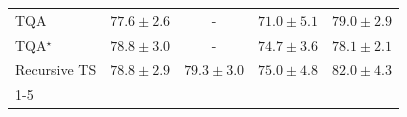 \begin{tabular}{l|cccc|}
TQA & {\cellcolor[HTML]{4295C3}} \color[HTML]{F1F1F1} $77.6\pm 2.6$ & {\cellcolor[HTML]{000000}} \color[HTML]{F1F1F1} {\cellcolor{white}} \color{black} - & {\cellcolor[HTML]{FFF7FB}} \color[HTML]{000000} $71.0\pm 5.1$ & {\cellcolor[HTML]{0D75B3}} \color[HTML]{F1F1F1} $79.0\pm 2.9$ \\
TQA$^\star$ & {\cellcolor[HTML]{157AB5}} \color[HTML]{F1F1F1} $78.8\pm 3.0$ & {\cellcolor[HTML]{000000}} \color[HTML]{F1F1F1} {\cellcolor{white}} \color{black} - & {\cellcolor[HTML]{B3C3DE}} \color[HTML]{000000} $74.7\pm 3.6$ & {\cellcolor[HTML]{2D8ABD}} \color[HTML]{F1F1F1} $78.1\pm 2.1$ \\
Recursive TS & {\cellcolor[HTML]{157AB5}} \color[HTML]{F1F1F1} $78.8\pm 2.9$ & {\cellcolor[HTML]{056FAE}} \color[HTML]{F1F1F1} $79.3\pm 3.0$ & {\cellcolor[HTML]{A9BFDC}} \color[HTML]{000000} $75.0\pm 4.8$ & {\cellcolor[HTML]{023858}} \color[HTML]{F1F1F1} $82.0\pm 4.3$ \\
\cline{1-5}
\bottomrule
\end{tabular}
